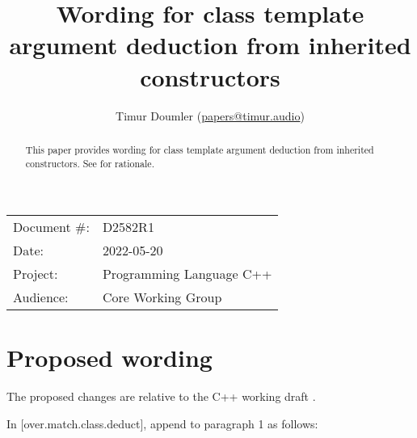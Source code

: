 

\newcommand{\forceindent}{\parindent=1em\indent\parindent=0pt\relax} %



\title{Wording for class template argument deduction from inherited constructors}
\author{
  Timur Doumler \small(\href{mailto:papers@timur.audio}{papers@timur.audio})
}
\date{}
\maketitle

\begin{tabular}{ll}
Document \#: & D2582R1 \\
Date: & 2022-05-20\\
Project: & Programming Language C++ \\
Audience: & Core Working Group
\end{tabular}


\begin{abstract}
This paper provides wording for class template argument deduction from inherited constructors. See \cite{P1021R6} for rationale.
\end{abstract}
\vspace{5mm}
\section{Proposed wording}

The proposed changes are relative to the C++ working draft \cite{N4910}. 

In [over.match.class.deduct], append to paragraph 1 as follows:

